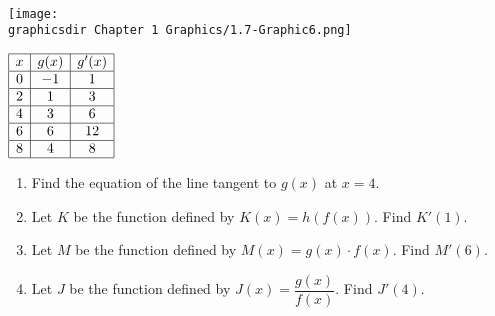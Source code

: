  \\
\begin{minipage}[t]{0.75\textwidth} \vspace{0pt}%
    \texttt{[image: \\graphicsdir Chapter 1 Graphics/1.7-Graphic6.png]}
\end{minipage} \hfill \begin{minipage}[t]{0.2\textwidth} \vspace{11pt}%
    \def\arraystretch{1.4}
    $\begin{array}{|c|c|c|}
        \hline
        x & g(x) & g'(x) \\ \hline
        0 & -1 & 1 \\ \hline
        2 & 1 & 3 \\ \hline
        4 & 3 & 6 \\ \hline
        6 & 6 & 12 \\ \hline
        8 & 4 & 8 \\
        \hline
    \end{array}$
\end{minipage} 

\begin{enumerate}[label=\hspace{11pt}(\alph*), align=left, leftmargin=*, labelsep=0.25em]
    \item Find the equation of the line tangent to $g(x)$ at $x = 4$.
    \item Let $K$ be the function defined by $K(x) = h(f(x))$. Find $K'(1)$.
    \item Let $M$ be the function defined by $M(x) = g(x) \cdot f(x)$. Find $M'(6)$.
    \item Let $J$ be the function defined by $J(x) = \dfrac{g(x)}{f(x)}$. Find $J'(4)$.
\end{enumerate} \vspace{11pt}


